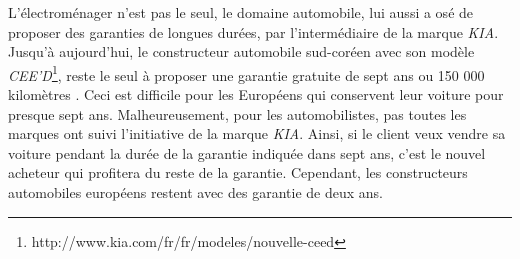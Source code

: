 \smallbreak
L’électroménager n'est pas le seul, le domaine automobile, lui aussi a osé de proposer  des garanties de longues durées, par l’intermédiaire de la marque \textit{KIA}. Jusqu’à aujourd'hui, le constructeur automobile sud-coréen avec son modèle \textit{CEE’D}\footnote{http://www.kia.com/fr/fr/modeles/nouvelle-ceed}, reste le seul à proposer une garantie gratuite de sept ans ou 150 000 kilomètres \cite{kia}. Ceci est difficile pour les Européens qui conservent leur voiture pour presque sept ans. Malheureusement, pour les automobilistes, pas toutes les marques ont suivi l’initiative de la marque \textit{KIA}. Ainsi, si le client veux vendre sa voiture pendant la durée de la garantie indiquée dans sept ans, c'est le nouvel acheteur qui profitera du reste de la garantie. Cependant, les constructeurs automobiles européens restent avec des garantie de deux ans.


